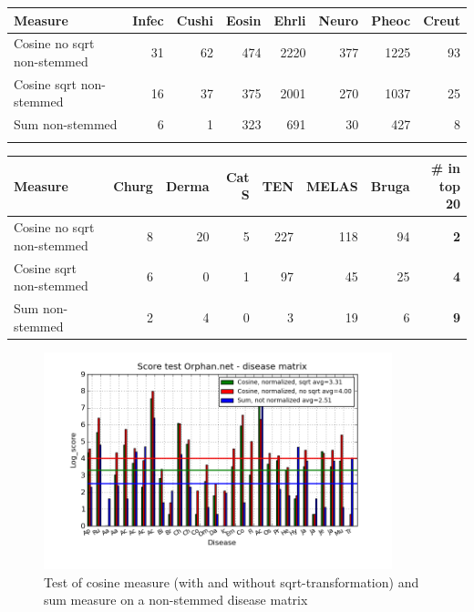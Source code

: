 \begin{table}[H]
  \begin{tiny}
  \label{testResult}
  \begin{tabular}{|l|r|r|r|r|r|r|r|}
    \hline
    Measure &Infec&Cushi&Eosin&Ehrli&Neuro&Pheoc&Creut \\
    \hline
    Cosine no sqrt non-stemmed &31&62&474&2220&377&1225&93 \\
    \hline
    Cosine sqrt non-stemmed &16&37&375&2001&270&1037&25 \\
    \hline
    Sum non-stemmed &6&1&323&691&30&427&8  \\
    \hline
  \multicolumn{8}{c}{} \\
  \end{tabular}
  \begin{tabular}{|l|r|r|r|r|r|r|r|}
    \hline
    Measure &Churg&Derma&Cat S&TEN&MELAS&Bruga& \scriptsize{\textbf{\# in top 20}} \\
    \hline
    Cosine no sqrt non-stemmed &8&20&5&227&118&94 &\scriptsize{\textbf{2}} \\
    \hline
    Cosine sqrt non-stemmed &6&0&1&97&45&25 &  \scriptsize{\textbf{4}}\\
    \hline
    Sum non-stemmed &2&4&0&3&19&6 & \scriptsize{\textbf{9}} \\
    \hline
  \end{tabular}
  \end{tiny}
\end{table}

\begin{figure}[H]
        \begin{center}
          \includegraphics[width=0.9\textwidth]{barcharts/diseaseMatrix_orphan_hist_NOTnorm_3000_ns_cos_sqrt_cos_sum_nn.png}
        \end{center}
        \caption{Test of cosine measure (with and without sqrt-transformation) and sum measure on a non-stemmed disease matrix}
        \label{diseaseMatrix_orphan_hist_NOTnorm_3000_ns_cos_sqrt_cos_sum_nn}
\end{figure}


